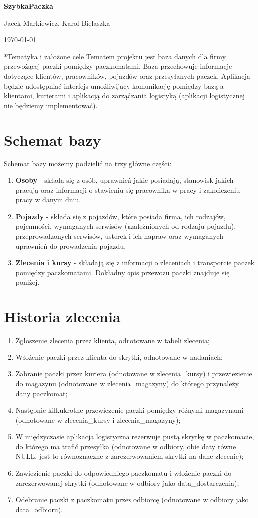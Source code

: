 \documentclass{article} %
\newcommand{\maketitletwo}[2][]{\begin{center}
        \Large{\textbf{SzybkaPaczka}} %
        \vspace{5pt}
        
        \normalsize{Jacek Markiewicz, Karol Bielaszka %
        
        \today}        %
        \vspace{15pt}
        
\end{center}}
\begin{document}
    \maketitletwo[5] 
    
\section*{Tematyka i założone cele}
\noindent Tematem projektu jest baza danych dla firmy przewożącej paczki pomiędzy paczkomatami. Baza przechowuje informacje dotyczące klientów, pracowników, pojazdów oraz przesyłanych paczek. Aplikacja będzie udostępniać interfejs umożliwijący komunikację pomiędzy bazą a klientami, kurierami i aplikacją do zarządzania logistyką (aplikacji logistycznej nie będziemy implementować). 
\section*{Schemat bazy}
    Schemat bazy możemy podzielić na trzy główne części:
    \begin{enumerate}
        \item \textbf{Osoby} - składa się z osób, uprawnień jakie posiadają, stanowisk jakich pracują oraz informacji o stawieniu się pracownika w pracy i zakończeniu pracy w danym dniu.
        \item \textbf{Pojazdy} - składa się z pojazdów, które posiada firma, ich rodzajów, pojemności, wymaganych serwisów (uzależnionych od rodzaju pojazdu), przeprowadzonych serwisów, usterek i ich napraw oraz wymaganych uprawnień do prowadzenia pojazdu.
        \item \textbf{Zlecenia i kursy} - składają się z informacji o zleceniach i transporcie paczek pomiędzy paczkomatami. Dokładny opis przewozu paczki znajduje się poniżej.
    \end{enumerate}
\noindent 
\section*{Historia zlecenia}
    \begin{enumerate}
        \item Zgłoszenie zlecenia przez klienta, odnotowane w tabeli zlecenia;
        \item Włożenie paczki przez klienta do skrytki, odnotowane w nadaniach;
        \item Zabranie paczki przez kuriera (odnotowane w zlecenia\_kursy) i przewiezienie do magazynu (odnotowane w zlecenia\_magazyny) do którego przynależy dany paczkomat;
        \item Następnie kilkukrotne przewiezenie paczki pomiędzy różnymi magazynami (odnotowane w zlecenia\_kursy i zlecenia\_magazyny);
        \item W międzyczasie aplikacja logistyczna rezerwuje pustą skrytkę w paczkomacie, do którego ma trafić przesyłka (odnotowane w odbiory, obie daty równe NULL, jest to równoznaczne z zarezerwowaniem skrytki na dane zlecenie);
        \item Zawiezienie paczki do odpowiedniego paczkomatu i włożenie paczki do zarezerwowanej skrytki (odnotowane w odbiory jako data\_dostarczenia);
        \item Odebranie paczki z paczkomatu przez odbiorcę (odnotowane w odbiory jako data\_odbioru).
    \end{enumerate}
\end{document}
